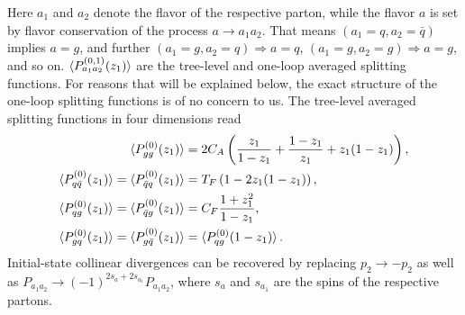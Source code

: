 Here $a_1$ and $a_2$ denote the flavor of the respective parton, while the flavor $a$ is set by flavor conservation of the process $a \rightarrow a_1 a_2$. That means $(a_1 = q,a_2 = \bar{q})$ implies $a = g$, and further $(a_1 = g,a_2 = q) \Rightarrow a = q$, $(a_1 = g,a_2 = g) \Rightarrow a = g$, and so on. $\braket{P^{(0,1)}_{a_1 a_2}(z_1)}$ are the tree-level and one-loop averaged splitting functions. For reasons that will be explained below, the exact structure of the one-loop splitting functions is of no concern to us. The tree-level averaged splitting functions in four dimensions read
\begin{equation}
\begin{split}
\braket{P_{gg}^{(0)}(z_1)} &= 2 C_A \left( \frac{z_1}{1 - z_1} + \frac{1 - z_1}{z_1} + z_1 (1 - z_1) \right), \\
\braket{P_{q \bar{q}}^{(0)} (z_1)} = \braket{P_{\bar{q}q}^{(0)} (z_1)} &= T_F \left(1 - 2 z_1 (1 - z_1) \right), \\
\braket{P_{qg}^{(0)}(z_1)} = \braket{P_{\bar{q}g}^{(0)}(z_1)} &= C_F \frac{1 + z_1^2}{1 - z_1}, \\
\braket{P^{(0)}_{gq}(z_1)} = \braket{P_{g\bar{q}}^{(0)}(z_1)} &= \braket{P_{qg}^{(0)} (1 - z_1)}.
\end{split}
\end{equation}
Initial-state collinear divergences can be recovered by replacing $p_2 \rightarrow - p_2$ as well as $P_{a_1 a_2} \rightarrow (-1)^{2 s_a + 2 s_{a_1}} P_{a_1 a_2}$, where $s_a$ and $s_{a_1}$ are the spins of the respective partons.

